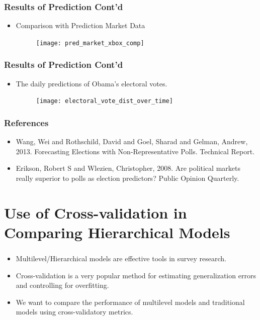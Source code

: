 \documentclass[xetex,mathserif,serif]{beamer}
\begin{document}
\begin{frame}
  \frametitle{Results of Prediction Cont'd}
  \begin{itemize}
  \item Comparison with Prediction Market Data
    \begin{figure}[htbp]
      \centering
      \texttt{[image: pred\_market\_xbox\_comp]}
    \end{figure}
  \end{itemize}
\end{frame}


\begin{frame}
  \frametitle{Results of Prediction Cont'd}
  \begin{itemize}
  \item The daily predictions of Obama's electoral votes.
    \begin{figure}[htbp]
      \centering
      \texttt{[image: electoral\_vote\_dist\_over\_time]}
    \end{figure}
  \end{itemize}
\end{frame}

\begin{frame}
  \frametitle{References}
  \begin{itemize}
  \item Wang, Wei and Rothschild, David and Goel, Sharad and Gelman, Andrew,
    2013. Forecasting Elections with Non-Representative Polls. Technical Report.
  \item Erikson, Robert S and Wlezien, Christopher, 2008. Are political markets
    really superior to polls as election predictors? Public Opinion Quarterly.
  \end{itemize}
\end{frame}
\section[Cross-validation]{Use of Cross-validation in Comparing Hierarchical Models}

\begin{frame}
  \frametitle{}
  \begin{itemize}
  \item Multilevel/Hierarchical models are effective tools in survey research.
  \item Cross-validation is a very popular method for estimating generalization
    errors and controlling for overfitting.
  \item We want to compare the performance of multilevel models and traditional
    models using cross-validatory metrics.
  \end{itemize}
\end{frame}
\end{document}
